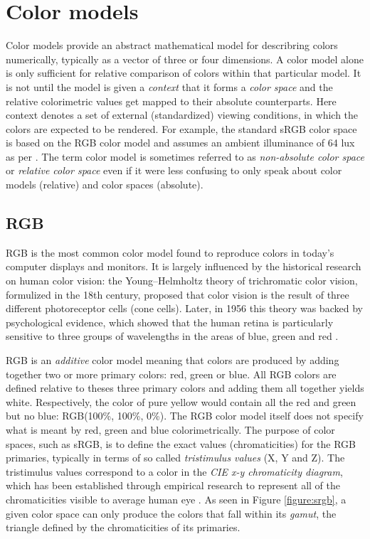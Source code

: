 \documentclass[thesis.tex]{subfiles}
\begin{document}
\section{Color models}
\label{section:rgbhsv}

Color models provide an abstract mathematical model for describring colors numerically, typically as a vector of three or four dimensions. A color model alone is only sufficient for relative comparison of colors within that particular model. It is not until the model is given a \textit{context} that it forms a \textit{color space} and the relative colorimetric values get mapped to their absolute counterparts. Here context denotes a set of external (standardized) viewing conditions, in which the colors are expected to be rendered. For example, the standard sRGB color space is based on the RGB color model and assumes an ambient illuminance of 64 lux as per \cite{iec}. The term color model is sometimes referred to as \textit{non-absolute color space} or \textit{relative color space} even if it were less confusing to only speak about color models (relative) and color spaces (absolute).

\subsection{RGB}
RGB is the most common color model found to reproduce colors in today's computer displays and monitors. It is largely influenced by the historical research on human color vision: the Young–Helmholtz theory of trichromatic color vision, formulized in the 18th century, proposed that color vision is the result of three different photoreceptor cells (cone cells). Later, in 1956 this theory was backed by psychological evidence, which showed that the human retina is particularly sensitive to three groups of wavelengths in the areas of blue, green and red \cite{svaetichin}.

RGB is an \textit{additive} color model meaning that colors are produced by adding together two or more primary colors: red, green or blue. All RGB colors are defined relative to theses three primary colors and adding them all together yields white. Respectively, the color of pure yellow would contain all the red and green but no blue: RGB(100\%, 100\%, 0\%). The RGB color model itself does not specify what is meant by red, green and blue colorimetrically. The purpose of color spaces, such as sRGB, is to define the exact values (chromaticities) for the RGB primaries, typically in terms of so called \textit{tristimulus values} (X, Y and Z). The tristimulus values correspond to a color in the \textit{CIE x-y chromaticity diagram}, which has been established through empirical research to represent all of the chromaticities visible to average human eye \cite{cie}. As seen in Figure \ref{figure:srgb}, a given color space can only produce the colors that fall within its \textit{gamut}, the triangle defined by the chromaticities of its primaries.
\end{document}
